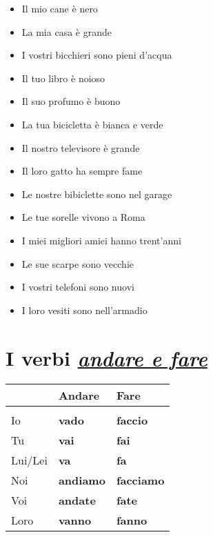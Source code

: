 \documentclass[letter,11pt]{article}
\begin{document}
\vskip 0.5in
\begin{multicols}{2}
\begin{itemize}
    \item Il mio cane è nero
    \item La mia casa è grande
    \item I vostri bicchieri sono pieni d'acqua
    \item Il tuo libro è noioso
    \item Il suo profumo è buono
    \item La tua bicicletta è bianca e verde
    \item Il nostro televisore è grande
    \item Il loro gatto ha sempre fame
    \item Le nostre bibiclette sono nel garage
    \item Le tue sorelle vivono a Roma
    \item I miei migliori amici hanno trent'anni
    \item Le sue scarpe sono vecchie
    \item I vostri telefoni sono nuovi
    \item I loro vesiti sono nell'armadio


\end{itemize}
\end{multicols}

\vskip 0.2in
\section*{I verbi \underline{\emph{andare e fare}}}
\vskip 0.2in

\begin{tabular}{ |p{3cm}| p{2cm}| p{2cm}| }
      & Andare  & Fare  \\
    \hline
    \hline
     &  &   \\ \hline
    Io      & {\bf vado}   & {\bf faccio}    \\ \hline
    Tu      & {\bf vai}    & {\bf fai}       \\ \hline
    Lui/Lei & {\bf va}     & {\bf fa}        \\ \hline
    Noi     & {\bf andiamo} & {\bf facciamo}  \\ \hline
    Voi     & {\bf andate}  & {\bf fate}      \\ \hline
    Loro    & {\bf vanno}   & {\bf fanno}     \\ \hline
    \hline
\end{tabular}
\end{document}
